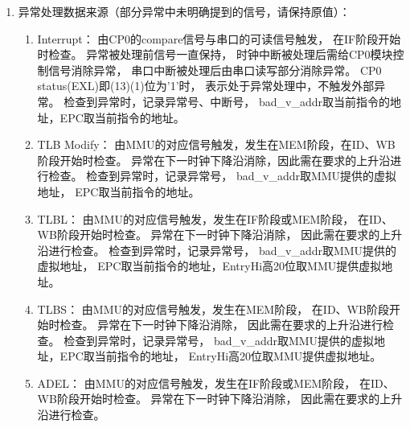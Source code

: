 \begin{enumerate}
            \item
            异常处理数据来源（部分异常中未明确提到的信号，请保持原值）：
                \begin{enumerate}
                    \item
                    Interrupt：
                        由CP0的compare信号与串口的可读信号触发，%
                        在IF阶段开始时检查。
                        异常被处理前信号一直保持，%
                        时钟中断被处理后需给CP0模块控制信号消除异常，%
                        串口中断被处理后由串口读写部分消除异常。
                        CP0 status(EXL)即(13)(1)位为'1'时，%
                        表示处于异常处理中，不触发外部异常。
                        检查到异常时，记录异常号、中断号，%
                        bad\_v\_addr取当前指令的地址，EPC取当前指令的地址。
                    \item
                    TLB Modify：
                        由MMU的对应信号触发，发生在MEM阶段，在ID、WB阶段开始时检查。
                        异常在下一时钟下降沿消除，因此需在要求的上升沿进行检查。
                        检查到异常时，记录异常号，%
                        bad\_v\_addr取MMU提供的虚拟地址，%
                        EPC取当前指令的地址。
                    \item
                    TLBL：
                        由MMU的对应信号触发，发生在IF阶段或MEM阶段，%
                        在ID、WB阶段开始时检查。%
                        异常在下一时钟下降沿消除，%
                        因此需在要求的上升沿进行检查。%
                        检查到异常时，记录异常号，%
                        bad\_v\_addr取MMU提供的虚拟地址，%
                        EPC取当前指令的地址，EntryHi高20位取MMU提供虚拟地址。
                    \item
                    TLBS：
                        由MMU的对应信号触发，发生在MEM阶段，%
                        在ID、WB阶段开始时检查。
                        异常在下一时钟下降沿消除，%
                        因此需在要求的上升沿进行检查。%
                        检查到异常时，记录异常号，%
                        bad\_v\_addr取MMU提供的虚拟地址，EPC取当前指令的地址，%
                        EntryHi高20位取MMU提供虚拟地址。
                    \item
                    ADEL：
                        由MMU的对应信号触发，发生在IF阶段或MEM阶段，%
                        在ID、WB阶段开始时检查。%
                        异常在下一时钟下降沿消除，%
                        因此需在要求的上升沿进行检查。%

\end{enumerate}
\end{enumerate}
